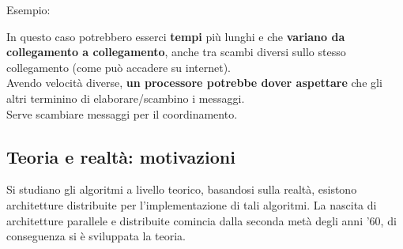 Esempio: 
\begin{center}
\end{center}

In questo caso potrebbero esserci \textbf{tempi} più lunghi e che \textbf{variano da collegamento a collegamento}, anche tra scambi diversi sullo stesso collegamento (come può accadere su internet). \\

Avendo velocità diverse, \textbf{un processore potrebbe dover aspettare} che gli altri terminino di elaborare/scambino i messaggi. \\
Serve scambiare messaggi per il coordinamento.\\

\newpage

\subsection*{Teoria e realtà: motivazioni}
Si studiano gli algoritmi a livello teorico, basandosi sulla realtà, esistono architetture distribuite per l'implementazione di tali algoritmi. La nascita di architetture parallele e distribuite comincia dalla seconda metà degli anni '60, di conseguenza si è sviluppata la teoria. \\

